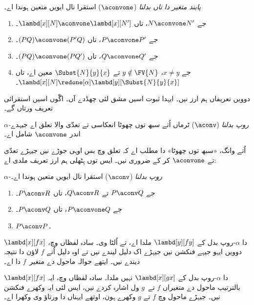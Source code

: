 \documentclass[../../../include/open-logic-section]{subfiles}
\begin{document}
\begin{defn} 
  \emph{پابند متغیر دا ناں بدلنا} ($\aconvone$) استقرا نال
  ایویں متعین ہوندا اے۔
  \begin{enumerate}
  \item جے $N \aconvone N'$، تاں $\lambd[x][N] \aconvone
    \lambd[x][N']$۔ 
  \item جے $P \aconvone P'$، تاں $(PQ) \aconvone (P'Q)$۔ 
  \item جے $Q \aconvone Q'$، تاں $(PQ) \aconvone (PQ')$۔ 
  \item جے $x \neq y$، $y \notin \FV{N}$ تے $\Subst{N}{y}{x}$ معین اے، تاں
    $\lambd[x][N] \redone[\alpha] \lambd[y][\Subst{N}{y}{x}]$۔
  \end{enumerate}
\end{defn}

دوویں تعریفاں ہم ارز نیں۔ ایہدا ثبوت اسیں مشق لئی چھڈدے آں۔
اگّوں اسیں استقرائی تعریف ورتاں گے۔

\begin{defn}
  \emph{$\alpha$-روپ بدلنا} ($\aconv$) ٹرماں اُتے سبھ توں چھوٹا
  انعکاسی تے تعدّی والا تعلق اے جیہدے اندر $\aconvone$ شامل اے۔
\end{defn}

اُتے وانگ، «سبھ توں چھوٹا» دا مطلب اے کہ تعلق وچ بس اوہی
جوڑے نیں جیہڑے تعدّی تے $\aconvone$ کر کے ضروری نیں۔ ایس توں
ہِٹھلی ہم ارز تعریف ملدی اے:

\begin{defn} 
  \emph{$\alpha$-روپ بدلنا} ($\aconv$) استقرا نال ایویں متعین ہوندا اے۔
  \begin{enumerate}
  \item جے $P \aconv Q$ تے $Q \aconv R$، تاں $P \aconv R$۔
  \item جے $P \aconvone Q$، تاں $P \aconv Q$۔ 
  \item $P \aconv P$۔ 
  \end{enumerate}
\end{defn}

\begin{ex}
  $\lambd[x][f x]$ دا $\alpha$-روپ بدل کے $\lambd[y][f
  y]$ ملدا اے، تے اُلٹا وی۔ سادہ لفظاں وچ، دوویں ایہو جیہے
  فنکشن نیں جیہڑے اک دلیل لیندے نیں تے اوہ دلیل اُتے $f$ لاؤن دا
  نتیجہ دیندے نیں۔ ایتھے حوالہ ماحول دے متغیر~$f$ دا اے۔

  $\lambd[x][f x]$ دا $\alpha$-روپ بدل کے $\lambd[x][g
    x]$ نہیں ملدا۔ سادہ لفظاں وچ، ایہ بالترتیب ماحول دے متغیراں
  $f$ تے~$g$ ول اشارہ کردے نیں، ایس لئی ایہ وکھرے فنکشن نیں۔
  جیہڑے ماحول وچ $f$ تے $g$ وکھرے ہون، اوتھے ایہناں دا ورتاؤ
  وی وکھرا اے۔
\end{ex}
\end{document}
